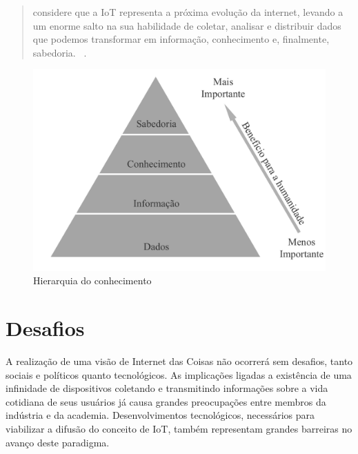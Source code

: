 \documentclass[twoside,english,brazilian]{UNISINOSmonografia}
\begin{document}
	\begin{quote}
		considere que a IoT representa a próxima evolução da internet, 
		levando a um enorme salto na sua habilidade de coletar, analisar e 
		distribuir dados que podemos transformar em informação, 
		conhecimento e, finalmente, sabedoria.~
		\cite[p.~2]{Cisco2011}.
	\end{quote}

	\begin{figure}
		\caption{Hierarquia do conhecimento}
		\label{fig:wkid}
		\centering
		\begin{minipage}{.8\textwidth}
			\includegraphics[width=\textwidth]{wkid}
		\end{minipage}
	\end{figure}


\section{Desafios}


A realização de uma visão de Internet das Coisas não ocorrerá sem desafios, 
tanto sociais e políticos quanto tecnológicos.
As implicações ligadas a existência de uma infinidade de dispositivos 
coletando e transmitindo informações sobre a vida cotidiana de seus usuários 
já causa grandes preocupações entre membros da indústria e da academia.
Desenvolvimentos tecnológicos, necessários para viabilizar a difusão do 
conceito de IoT, também representam grandes barreiras no avanço deste 
paradigma.
\end{document}
